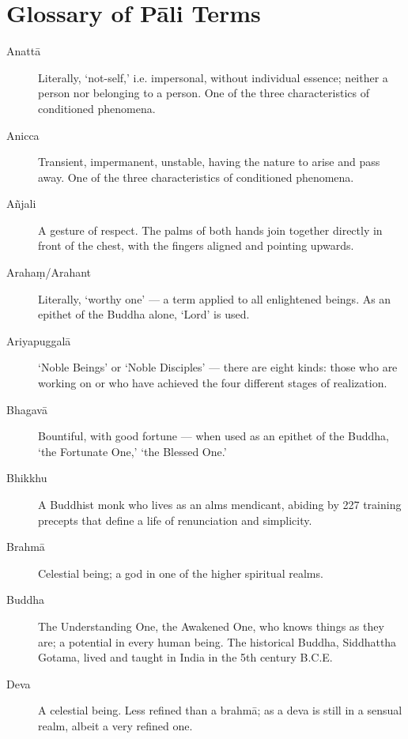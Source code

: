 \chapter{Glossary of Pāli Terms}

\enlargethispage{2\baselineskip}

\begin{description}

\item[Anattā] Literally, `not-self,' i.e. impersonal, without individual
  essence; neither a person nor belonging to a person. One of the three
  characteristics of conditioned phenomena.

\item[Anicca] Transient, impermanent, unstable, having the nature to
  arise and pass away. One of the three characteristics of conditioned
  phenomena.

\item[Añjali] A gesture of respect. The palms of both hands join
  together directly in front of the chest, with the fingers aligned and
  pointing upwards.

\item[Arahaṃ/Arahant] Literally, ‘worthy one’ --- a term applied to all
  enlightened beings. As an epithet of the Buddha alone, `Lord' is used.

\item[Ariyapuggalā] ‘Noble Beings’ or ‘Noble Disciples’ --- there are
  eight kinds: those who are working on or who have achieved the four
  different stages of realization.

\item[Bhagavā] Bountiful, with good fortune --- when used as an epithet of
  the Buddha, `the Fortunate One,' `the Blessed One.'

\item[Bhikkhu] A Buddhist monk who lives as an alms mendicant, abiding
  by 227 training precepts that define a life of renunciation and
  simplicity.

\item[Brahmā] Celestial being; a god in one of the higher spiritual
  realms.

\item[Buddha] The Understanding One, the Awakened One, who knows things
  as they are; a potential in every human being. The historical Buddha,
  Siddhattha Gotama, lived and taught in India in the 5th century B.C.E.

\item[Deva] A celestial being. Less refined than a brahmā; as a deva is
  still in a sensual realm, albeit a very refined one.


\end{description}
